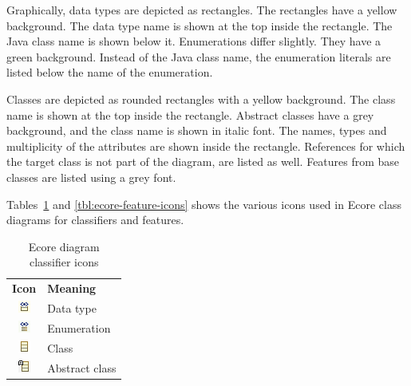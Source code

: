 Graphically, data types are depicted as rectangles. The rectangles have a
yellow background. The data type name is shown at the top inside the
rectangle. The Java class name is shown below it. Enumerations differ
slightly. They have a green background. Instead of the Java class name,
the enumeration literals are listed below the name of the enumeration.

Classes are depicted as rounded rectangles with a yellow background. The
class name is shown at the top inside the rectangle. Abstract classes have
a grey background, and the class name is shown in italic font. The names,
types and multiplicity of the attributes are shown inside the rectangle.
References for which the target class is not part of the diagram, are
listed as well. Features from base classes are listed using a grey font.

Tables~\ref{tbl:ecore-classifier-icons} and \ref{tbl:ecore-feature-icons}
shows the various icons used in Ecore class diagrams for classifiers and
features.

\begin{table}
\caption{Ecore diagram classifier icons}\label{tbl:ecore-classifier-icons}
\begin{center}
\begin{tabular}[htb]{@{}|c|@{\quad} l |}
    \hline
    \textbf{Icon} & \textbf{Meaning} \\
    \includegraphics{figures/ecore_icon_datatype.png} & Data type \\
    \includegraphics{figures/ecore_icon_enum.png} & Enumeration \\
    \includegraphics{figures/ecore_icon_class.png} & Class \\
    \includegraphics{figures/ecore_icon_class_abstr.png} & Abstract class \\
    \hline
\end{tabular}
\end{center}
\end{table}

